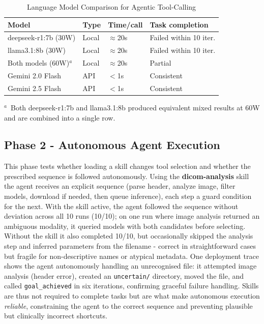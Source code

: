 \documentclass[1p,12pt]{elsarticle}
\begin{document}
\begin{table}[H]
  \caption{Language Model Comparison for Agentic Tool-Calling}
  \label{tab:model-comparison}
  \centering
  \begin{tabular}{llll}
    \toprule
    Model & Type & Time/call & Task completion \\
    \midrule
    deepseek-r1:7b (30W) & Local & $\approx$20s & Failed within 10 iter. \\
    llama3.1:8b (30W)    & Local & $\approx$20s & Failed within 10 iter. \\
    Both models (60W)$^{a}$ & Local & $\approx$20s & Partial \\
    Gemini 2.0 Flash     & API   & $<$1s        & Consistent \\
    Gemini 2.5 Flash     & API   & $<$1s        & Consistent \\
    \bottomrule
  \end{tabular}
  \par\smallskip
  \raggedright\footnotesize
  $^{a}$~Both deepseek-r1:7b and llama3.1:8b produced equivalent mixed results at 60W and are combined into a single row.
\end{table}

\subsection{Phase 2  -  Autonomous Agent Execution}
This phase tests whether loading a skill changes tool selection and whether the prescribed sequence is followed autonomously. Using the \textbf{dicom-analysis} skill the agent receives an explicit sequence (parse header, analyze image, filter models, download if needed, then queue inference), each step a guard condition for the next. With the skill active, the agent followed the sequence without deviation across all 10 runs (10/10); on one run where image analysis returned an ambiguous modality, it queried models with both candidates before selecting. Without the skill it also completed 10/10, but occasionally skipped the analysis step and inferred parameters from the filename - correct in straightforward cases but fragile for non-descriptive names or atypical metadata. One deployment trace shows the agent autonomously handling an unrecognised file: it attempted image analysis (header error), created an \texttt{uncertain/} directory, moved the file, and called \texttt{goal\_achieved} in six iterations, confirming graceful failure handling. Skills are thus not required to complete tasks but are what make autonomous execution \emph{reliable}, constraining the agent to the correct sequence and preventing plausible but clinically incorrect shortcuts.
\end{document}
